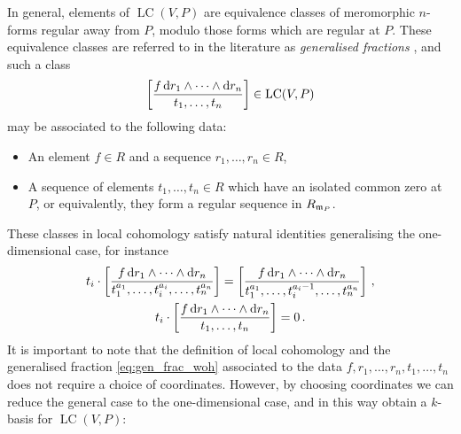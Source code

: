 \documentclass[english,letter paper,12pt,reqno]{article}
\theoremstyle{example}
\numberwithin{equation}{section}
\DeclareMathOperator{\LC}{LC}
\begin{document}
In general, elements of $\LC(V,P)$ are equivalence classes of meromorphic $n$-forms regular away from $P$, modulo those forms which are regular at $P$. These equivalence classes are referred to in the literature as \emph{generalised fractions} \cite{Lipman84,Kunz08}, and such a class
\begin{equation}\label{eq:gen_frac_woh}
\left[ \frac{f \ud{r_1} \wedge \cdots \wedge \ud{r_n}}{t_1, \ldots, t_n} \right] \in \LC(V,P)
\end{equation}
may be associated to the following data:
\begin{itemize}
\item An element $f \in R$ and a sequence $r_1,\ldots,r_n \in R$,
\item A sequence of elements $t_1,\ldots,t_n \in R$ which have an isolated common zero at $P$, or equivalently, they form a regular sequence in $R_{\mathfrak{m}_P}$.
\end{itemize}
These classes in local cohomology satisfy natural identities generalising the one-dimensional case, for instance
\begin{gather*}
t_i \cdot \left[ \frac{f \operatorname{d}\!{r_1} \wedge \cdots \wedge \operatorname{d}\!{r_n}}{t_1^{a_1}, \ldots, t_i^{a_i}, \ldots, t_n^{a_n}} \right] = \left[ \frac{f \operatorname{d}\!{r_1} \wedge \cdots \wedge \operatorname{d}\!{r_n}}{t_1^{a_1}, \ldots, t_i^{a_i-1}, \ldots, t_n^{a_n}} \right]\,,\\
t_i \cdot \left[ \frac{f \operatorname{d}\!{r_1} \wedge \cdots \wedge \operatorname{d}\!{r_n}}{t_1, \ldots, t_n} \right] = 0\,.
\end{gather*}
It is important to note that the definition of local cohomology and the generalised fraction \eqref{eq:gen_frac_woh} associated to the data $f,r_1,\ldots,r_n,t_1,\ldots,t_n$ does not require a choice of coordinates. However, by choosing coordinates we can reduce the general case to the one-dimensional case, and in this way obtain a $k$-basis for $\LC(V,P)$:
\end{document}
